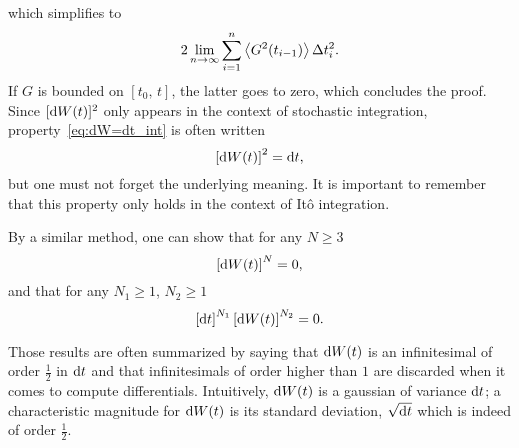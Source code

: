 which simplifies to
\begin{equation}
	2 \lim_{n\rightarrow\infty} \sum_{i=1}^n \esp{G^2(t_{i-1})}\Delta t_i^2.
\end{equation}
If $G$ is bounded on $[t_0,\,t]$, the latter goes to zero, which concludes the proof. Since $[\rm dW(t)]^2$ only appears in the context of stochastic integration, property~\eqref{eq:dW=dt_int} is often written
\begin{equation} \label{eq:dw2=dt}
	\left[\rm dW(t)\right]^2 = \rm dt,  	
\end{equation}  
but one must not forget the underlying meaning. It is important to remember that this property only holds in the context of Itô integration.

By a similar method, one can show that for any $N \ge 3$
\begin{equation}
	\left[\rm dW(t)\right]^{N} = 0,
\end{equation}
and that for any $N_1 \ge 1$, $N_2 \ge 1$
\begin{equation} \label{eq:dwdt=0}
	\left[\rm dt\right]^{N_1}\left[\rm dW(t)\right]^{N_2} = 0. 
\end{equation}

Those results are often summarized by saying that $\rm dW(t)$ is an infinitesimal of order $\frac{1}{2}$ in $\rm dt$ and that infinitesimals of order higher than $1$ are discarded when it comes to compute differentials. Intuitively, $\rm dW(t)$ is a gaussian of variance $\rm dt$; a characteristic magnitude for $\rm dW(t)$ is its standard deviation, $\sqrt{\rm dt}$ which is indeed of order $\frac{1}{2}$.

